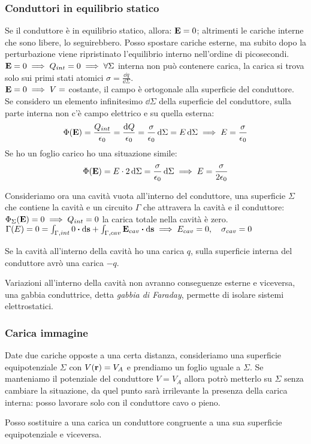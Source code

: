 \documentclass[12pt,a4paper]{article}
\begin{document}
\subsubsection{Conduttori in equilibrio statico}
Se il conduttore è in equilibrio statico, allora: $\vb{E}=0$; altrimenti le cariche interne che sono libere, lo seguirebbero.
Posso spostare cariche esterne, ma subito dopo la perturbazione viene ripristinato l'equilibrio interno nell'ordine di picosecondi.
\\
$\vb{E}=0 \implies Q_{int} = 0\implies \forall\Sigma$ interna non può contenere carica, la carica si trova solo sui primi stati atomici
$\sigma= \frac{\dd{q}}{\dd{\Sigma}}$.
\\
$\vb{E}=0 \implies  V = $ costante, il campo è ortogonale alla superficie del conduttore. 
\\Se considero un elemento infinitesimo $\dd{\Sigma}$ della superficie del conduttore, sulla parte interna non c'è campo elettrico e su quella esterna:
\begin{equation*}
    \Phi(\vb{E})= \frac{Q_{int}}{\epsilon_0}= \frac{\dd{Q}}{\epsilon_0}= \frac{\sigma}{\epsilon_0}\dd{\Sigma}= E\dd{\Sigma}\implies E = \frac{\sigma}{\epsilon_0}
\end{equation*}
Se ho un foglio carico ho una situazione simile:
\begin{equation*}
    \Phi(\vb{E}) = E \cdot 2\dd{\Sigma}= \frac{\sigma}{\epsilon_0}\dd{\Sigma}\implies E = \frac{\sigma}{2\epsilon_0}
\end{equation*}

Consideriamo ora una cavità vuota all'interno del conduttore, una superficie $\Sigma $ che contiene la cavità  e un circuito $\Gamma$ che attravera la cavità e il conduttore:
\\$\Phi_\Sigma(\vb{E})= 0 \implies Q_{int} = 0 $ la carica totale nella cavità è zero.
\\$\Gamma(E)= 0 = \int_{\Gamma,int}0 \vdot\dd{\vb{s}}+\int_{\Gamma,cav}\vb{E}_{cav}\vdot\dd{\vb{s}}\implies E_{cav}= 0, \quad
\sigma_{cav}=0$

Se la cavità all'interno della cavità ho una carica $q$, sulla superficie interna del conduttore avrò una carica $-q$.

Variazioni all'interno della cavità non avranno conseguenze esterne e viceversa, una gabbia conduttrice, detta \textit{gabbia di Faraday},
permette di isolare sistemi elettrostatici.

\subsubsection{Carica immagine}
Date due cariche opposte a una certa distanza, consideriamo una superficie equipotenziale $\Sigma$ con $V(\vb{r})= V_A$ e prendiamo un foglio 
uguale a $\Sigma$. Se manteniamo il potenziale del conduttore $V = V_A$ allora potrò metterlo su $\Sigma$ senza cambiare la situazione, da quel
punto sarà irrilevante la presenza della carica interna: posso lavorare solo con il conduttore cavo o pieno.
\begin{proposition}
    Posso sostituire a una carica un conduttore congruente a una sua superficie equipotenziale e viceversa.
\end{proposition}
\end{document}
